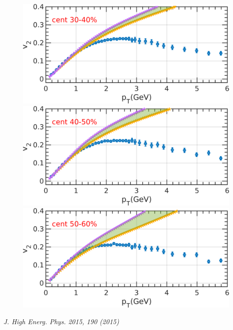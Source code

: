 \documentclass[aspectratio=1610]{beamer}
\begin{document}
\begin{frame}
\begin{figure}
\includegraphics[scale=0.19]{figs/IPGlasma/v2_pT30-40.png}
\includegraphics[scale=0.19]{figs/IPGlasma/v2_pT40-50.png}
\includegraphics[scale=0.19]{figs/IPGlasma/v2_pT50-60.png}
\end{figure}

\textit{J. High Energ. Phys. 2015, 190 (2015)}
\end{frame}



\end{document}
